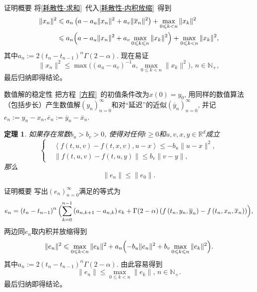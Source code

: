 \documentclass[aspectratio=16 9, 10pt, notheorems]{ctexbeamer}
\let\oldcref\cref
\renewcommand{\cref}[1]{\oldcref{#1}~}
\let\oldeqref\eqref
\renewcommand{\eqref}[1]{~\oldeqref{#1}~}
\newcommand{\mainEquation}{方程\eqref{方程}}
\newcommand{\realset}{\mathbb{R}}
\newcommand{\positiveinteger}{\mathbb{N_+}}
\newtheorem{theorem}{定理}
\begin{document}
\begin{frame}{证明概要}
    将\cref{耗散性-求和}代入\cref{耗散性-内积放缩}得到
    \begin{align*}
        \|x_n\|^2 &\leqslant a_n \left(a-a_u \|x_n\|^2 + a_v \|\overline x_n\|^2\right) + \max_{0\leqslant k<n} \|x_k\|^2
        \\ &\leqslant a_n \Bigl(a-a_u \|x_n\|^2 + a_v \max_{0\leqslant k\leqslant n} \|x_k\|^2\Bigr) + \max_{0\leqslant k<n} \|x_k\|^2,
    \end{align*}
    其中$a_n:=2\left(t_n-t_{n-1}\right)^\alpha \Gamma(2-\alpha)$. 现在易证
    \begin{equation*}
        \|x_n\|^2\leqslant \max\bigl((a_u-a_v)^{-1}a,\max_{0\leqslant k<n}\|x_k\|^2\bigr),\,n\in\positiveinteger,
    \end{equation*}
    最后归纳即得结论。
\end{frame}

\begin{frame}{数值解的稳定性}
    把\mainEquation 的初值条件改为$x(0)=y_0$, 用同样的数值算法（包括步长）产生数值解$\left(y_n\right)_{n=0}^\infty$和对“延迟”的近似$\left(\overline y_n\right)_{n=0}^\infty$, 并记$e_n:=y_n-x_n, \overline e_n:=\overline y_n-\overline x_n$.
    \begin{theorem}\label{stability}
        如果存在常数$b_u>b_v>0$, 使得对任何$t\geqslant 0$和$u,v,x,y\in \realset^d$成立
        \begin{equation*}
            \left\{
                \begin{aligned}
                    &\left<f(t,u,v)-f(t,x,v),u-x\right>\leqslant -b_u \|u-x\|^2,
                    \\ &\|f(t,u,v)-f(t,u,y)\|\leqslant b_v \|v-y\|,
                \end{aligned}
            \right.
        \end{equation*}
        那么
        \begin{equation*}
            \|e_n\|\leqslant \|e_0\|.
        \end{equation*}
    \end{theorem}
\end{frame}
\begin{frame}{证明概要}
    写出$\left(e_n\right)_{n=0}^\infty$满足的等式为
    \begin{equation*}
        e_n=\left(t_n-t_{n-1}\right)^\alpha\Bigl(\sum_{k=0}^{n-1}\left(a_{n,k+1}-a_{n,k}\right)e_k+\Gamma(2-\alpha)\left(f\left(t_n,y_n,\overline y_n\right)-f\left(t_n,x_n,\overline x_n\right)\right)\Bigr),
    \end{equation*}
    两边同$e_n$取内积并放缩得到
    \begin{equation*}
        \|e_n\|^2\leqslant \max_{0\leqslant k<n} \|e_k\|^2+a_n\Bigl(-b_u \|e_n\|^2+b_v \max_{0\leqslant k\leqslant n} \|e_k\|^2\Bigr).
    \end{equation*}
    其中$a_n:=2\left(t_n-t_{n-1}\right)^\alpha\Gamma(2-\alpha)$. 由此容易得到
    \begin{equation*}
        \|e_n\|\leqslant\max_{0\leqslant k< n} \|e_k\|,\,n\in\positiveinteger.
    \end{equation*}
    最后归纳即得结论。
\end{frame}
\end{document}

